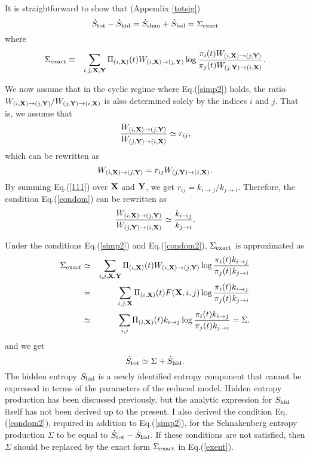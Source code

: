 \documentclass[aps,pre,amsmath,amssymb,floatfix,preprint,nofootinbib]{revtex4}
\begin{document}
It is straightforward to show that (Appendix \ref{totsig})
\begin{equation}
\dot S_{\rm tot} - \dot S_{\rm hid} =\dot S_{\rm shan} + \dot S_{\rm bol} = \Sigma_{\rm exact} \label{entpr}
\end{equation}
where 
\begin{eqnarray}
\Sigma_{\rm exact} &\equiv&  \sum_{i,j,{\bf X},{\bf Y}}   \Pi_{(i,{\bf X})}(t) W_{(i,{\bf X}) \to (j,{\bf Y})}  \log \frac{\pi_i (t) W_{(i,{\bf X}) \to (j,{\bf Y})} }{\pi_j (t) W_{(j,{\bf Y}) \to (i,{\bf X})} }.
\label{exent} 
\end{eqnarray}

We now assume that in the cyclic regime where Eq.(\ref{simp2}) holds, the ratio $ W_{(i,{\bf X}) \to (j,{\bf Y})} / W_{(j,{\bf Y}) \to (i,{\bf X})}$ is also determined solely by the indices $i$ and $j$. That is, we assume that
\begin{equation}
\frac{W_{(i,{\bf X}) \to (j,{\bf Y})}}{W_{(j,{\bf Y}) \to (i,{\bf X})}} \simeq r_{i j},\label{condom}
\end{equation}
which can be rewritten as
\begin{equation}
W_{(i,{\bf X}) \to (j,{\bf Y})}= r_{i j} W_{(j,{\bf Y}) \to (i,{\bf X})}. \label{111}
\end{equation}
By summing Eq.(\ref{111}) over ${\bf X}$ and ${\bf Y}$, we get $r_{i j}=k_{i \to j}/k_{j \to i}$. Therefore, the condition Eq.(\ref{condom}) can be rewritten as
\begin{equation}
\frac{W_{(i,{\bf X}) \to (j,{\bf Y})}}{W_{(j,{\bf Y}) \to (i,{\bf X})}} \simeq \frac{k_{i \to j}}{k_{j \to i}}.\label{condom2}
\end{equation}

Under the conditions Eq.(\ref{simp2}) and Eq.(\ref{condom2}), 
 $\Sigma_{\rm exact}$ is approximated as
\begin{eqnarray}
\Sigma_{\rm exact} &\simeq& \sum_{i,j,{\bf X},{\bf Y}}   \Pi_{(i,{\bf X})}(t) W_{(i,{\bf X}) \to (j,{\bf Y})}  \log \frac{\pi_i (t) k_{i\to j} }{\pi_j (t) k_{j \to i} } \nonumber\\
&=& \sum_{i,j,{\bf X}}   \Pi_{(i,{\bf X})}(t) F({\bf X},i,j) \log \frac{\pi_i (t) k_{i\to j} }{\pi_j (t) k_{j \to i} } \nonumber\\
&\simeq& \sum_{i,j}  \Pi_{(i,{\bf X})}(t) k_{i \to j} \log \frac{\pi_{i}(t) k_{i \to j}}{\pi_{j}(t) k_{j \to i}} = \Sigma.
\end{eqnarray}
and we get
\begin{equation}
\dot S_{\rm tot} \simeq  \Sigma +  \dot S_{\rm hid}.
\end{equation}
The hidden entropy $S_{\rm hid}$ is a newly identified entropy component that cannot be expressed in terms of the parameters of the reduced model. Hidden entropy production has been discussed previously\cite{kaw,epi,chun}, but the analytic expression for $S_{\rm hid}$ itself has not been derived up to the present. I also derived the condition Eq.(\ref{condom2}), required in addition to Eq.(\ref{simp2}), for the Schnakenberg entropy production $\Sigma$ to be equal to $\dot S_{\rm tot}-\dot S_{\rm hid}$. If these conditions are not satisfied, then $\Sigma$ should be replaced by the exact form $\Sigma_{\rm exact}$ in Eq.(\ref{exent}).
\end{document}
